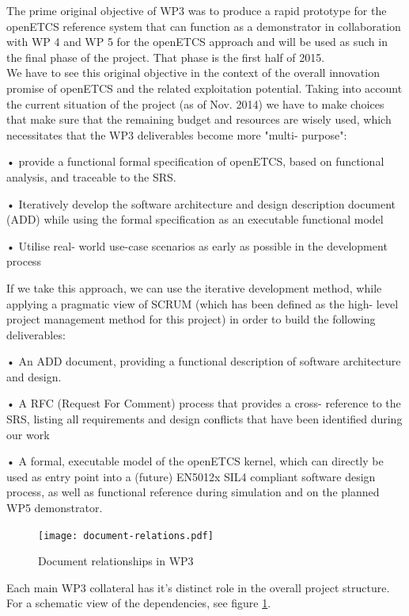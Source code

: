 The prime original objective of WP3 was to produce a rapid prototype for the openETCS reference system that can function as a demonstrator in collaboration with WP 4 and WP 5  for the openETCS approach and will be used as such in the final phase of the project. That phase is the first half of 2015. \\

We have to see this original objective in the context of the overall innovation promise of openETCS and the related exploitation potential.
Taking into account the current situation of the project (as of Nov. 2014) we have to make choices that make sure that the remaining budget and resources are wisely used, which necessitates that the WP3 deliverables become more "multi- purpose":

 •  provide a functional formal specification of openETCS, based on functional analysis, and traceable to the SRS.
 
 •  Iteratively develop the software architecture and design description document (ADD) while using the formal specification as an executable functional model
 
 •  Utilise real- world use-case scenarios as early as possible in the development process
 
If we take this approach, we can use the iterative development method, while applying a pragmatic view of SCRUM (which has been defined as the high- level project management method for this project) in order to build the following deliverables:

 •  An ADD document, providing a functional description of software architecture and design.
 
 •  A RFC (Request For Comment) process that provides a cross- reference to the SRS, listing all requirements and design conflicts that have been identified during our work
 
 •  A formal, executable model of the openETCS kernel, which can directly be used as entry point into a (future) EN5012x SIL4 compliant software design process, as well as functional reference during simulation and on the planned WP5 demonstrator.
 
 
\begin{figure}
  \centering
  \texttt{[image: document-relations.pdf]}
  \caption{Document relationships in WP3}
  \label{fig:doc-rels}
\end{figure}

Each main WP3 collateral has it's distinct role in the overall project structure. For a schematic view of the dependencies, see figure \ref{fig:doc-rels}. \\



